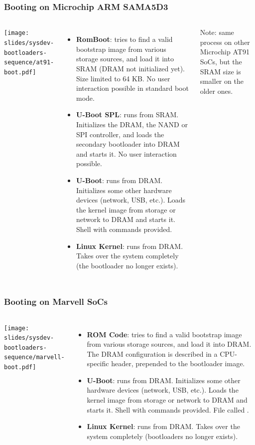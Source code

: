 \begin{frame}
  \frametitle{Booting on Microchip ARM SAMA5D3}
  \begin{columns}
    \texttt{[image: slides/sysdev-bootloaders-sequence/at91-boot.pdf]}
    \footnotesize
    \begin{itemize}
    \item {\bf RomBoot}: tries to find a valid bootstrap image from
      various storage sources, and load it into SRAM (DRAM not
      initialized yet). Size limited to 64 KB. No user interaction
      possible in standard boot mode.
    \item {\bf U-Boot SPL}: runs from SRAM. Initializes the DRAM,
      the NAND or SPI controller, and loads the secondary bootloader
      into DRAM and starts it. No user interaction possible.
    \item {\bf U-Boot}: runs from DRAM. Initializes some other hardware
      devices (network, USB, etc.).  Loads the kernel image from
      storage or network to DRAM and starts it. Shell with commands
      provided.
    \item {\bf Linux Kernel}: runs from DRAM. Takes over the system
      completely (the bootloader no longer exists).
    \end{itemize}
    Note: same process on other Microchip AT91 SoCs, but the
    SRAM size is smaller on the older ones.
  \end{columns}
\end{frame}

\begin{frame}
  \frametitle{Booting on Marvell SoCs}
  \begin{columns}
    \texttt{[image: slides/sysdev-bootloaders-sequence/marvell-boot.pdf]}
    \footnotesize
    \begin{itemize}
    \item {\bf ROM Code}: tries to find a valid bootstrap image from
      various storage sources, and load it into DRAM. The DRAM
      configuration is described in a CPU-specific header, prepended
      to the bootloader image.
    \item {\bf U-Boot}: runs from DRAM. Initializes some other hardware
      devices (network, USB, etc.).  Loads the kernel image from
      storage or network to DRAM and starts it. Shell with commands
      provided. File called .
    \item {\bf Linux Kernel}: runs from DRAM. Takes over the system
      completely (bootloaders no longer exists).
    \end{itemize}
  \end{columns}
\end{frame}

